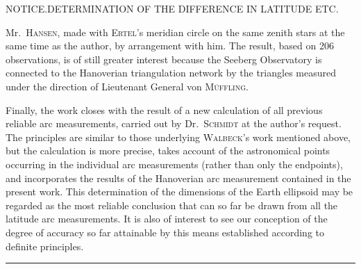 \clearpage
\noindent{}\parbox{\dimexpr\linewidth-4em\relax}{\centering\small NOTICE.\quad DETERMINATION OF THE DIFFERENCE IN LATITUDE ETC.}\hfill\mbox{}\par
\noindent Mr.\ \textsc{Hansen}, made with \textsc{Ertel}'s meridian circle on the same zenith stars
at the same time as the author, by arrangement with him. The result, based on 206 observations,
is of still greater interest because the Seeberg Observatory is connected to the Hanoverian
triangulation network by the triangles measured under the direction of Lieutenant General
von \textsc{Müffling}.

Finally, the work closes with the result of a new calculation of all previous reliable arc
measurements, carried out by Dr.\ \textsc{Schmidt} at the author's request. The principles are similar
to those underlying \textsc{Walbeck}'s work mentioned above, but the calculation is more precise,
takes account of  the astronomical points occurring in the individual arc
measurements (rather than only the endpoints), and incorporates the results of the Hanoverian
arc measurement contained in the present work. This determination of the dimensions of the
Earth ellipsoid may be regarded as the most reliable conclusion that can so far be drawn from
all the latitude arc measurements. It is also of interest to see our conception of the degree
of accuracy so far attainable by this means established according to definite principles.
\begin{center}\rule{.25\textwidth}{.4pt}\end{center}

